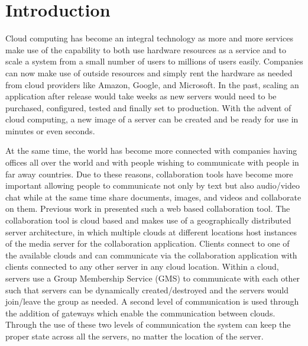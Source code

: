 \documentclass[conference]{IEEEtran}
\begin{document}




%
\IEEEpeerreviewmaketitle



\section{Introduction}

Cloud computing has become an integral technology as more and more services make use of the capability to both use hardware resources as a service and to scale a system from a small number of users to millions of users easily. Companies can now make use of outside resources and simply rent the hardware as needed from cloud providers like Amazon, Google, and Microsoft. In the past, scaling an application after release would take weeks as new servers would need to be purchased, configured, tested and finally set to production. With the advent of cloud computing, a new image of a server can be created and be ready for use in minutes or even seconds.

At the same time, the world has become more connected with companies having offices all over the world and with people wishing to communicate with people in far away countries. Due to these reasons, collaboration tools have become more important allowing people to communicate not only by text but also audio/video chat while at the same time share documents, images, and videos and collaborate on them. Previous work in \cite{bogdan:cts2012} presented such a web based collaboration tool. The collaboration tool is cloud based and makes use of a geographically distributed server architecture, in which multiple clouds at different locations host instances of the media server for the collaboration application. Clients connect to one of the available clouds and can communicate via the collaboration application with clients connected to any other server in any cloud location. Within a cloud, servers use a Group Membership Service (GMS) to communicate with each other such that servers can be dynamically created/destroyed and the servers would join/leave the group as needed. A second level of communication is used through the addition of gateways which enable the communication between clouds. Through the use of these two levels of communication the system can keep the proper state across all the servers, no matter the location of the server.
\end{document}
